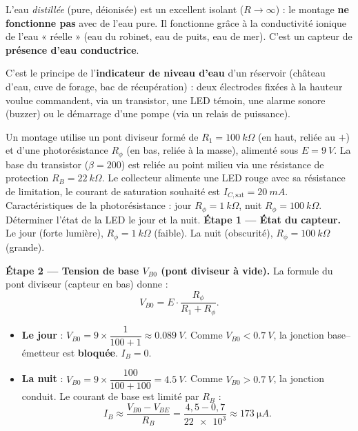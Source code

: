 \documentclass[11pt]{article}
\begin{document}
\begin{attention}
L'eau \emph{distillée} (pure, déionisée) est un excellent isolant ($R \to \infty$) : le montage \textbf{ne fonctionne pas} avec de l'eau pure. Il fonctionne grâce à la conductivité ionique de l'eau « réelle » (eau du robinet, eau de puits, eau de mer). C'est un capteur de \textbf{présence d'eau conductrice}.
\end{attention}

C'est le principe de l'\textbf{indicateur de niveau d'eau} d'un réservoir (château d'eau, cuve de forage, bac de récupération) : deux électrodes fixées à la hauteur voulue commandent, via un transistor, une LED témoin, une alarme sonore (buzzer) ou le démarrage d'une pompe (via un relais de puissance).

\begin{exoresolu}
Un montage utilise un pont diviseur formé de $R_1 = \SI{100}{k\Omega}$ (en haut, reliée au $+$) et d'une photorésistance $R_\phi$ (en bas, reliée à la masse), alimenté sous $E = \SI{9}{V}$. La base du transistor ($\beta = 200$) est reliée au point milieu via une résistance de protection $R_B = \SI{22}{k\Omega}$. Le collecteur alimente une LED rouge avec sa résistance de limitation, le courant de saturation souhaité est $I_{C,\text{sat}} = \SI{20}{mA}$. Caractéristiques de la photorésistance : jour $R_\phi = \SI{1}{k\Omega}$, nuit $R_\phi = \SI{100}{k\Omega}$. Déterminer l'état de la LED le jour et la nuit.
\tcblower
\textbf{Étape 1 — État du capteur.}
Le jour (forte lumière), $R_\phi = \SI{1}{k\Omega}$ (faible). La nuit (obscurité), $R_\phi = \SI{100}{k\Omega}$ (grande).

\textbf{Étape 2 — Tension de base $V_{B0}$ (pont diviseur à vide).}
La formule du pont diviseur (capteur en bas) donne :
\[ V_{B0} = E \cdot \frac{R_\phi}{R_1 + R_\phi}. \]
\begin{itemize}
\item \textbf{Le jour} : $V_{B0} = 9 \times \dfrac{1}{100 + 1} \approx \SI{0,089}{V}$.
Comme $V_{B0} < \SI{0,7}{V}$, la jonction base--émetteur est \textbf{bloquée}. $I_B = 0$.
\item \textbf{La nuit} : $V_{B0} = 9 \times \dfrac{100}{100 + 100} = \SI{4,5}{V}$.
Comme $V_{B0} > \SI{0,7}{V}$, la jonction conduit. Le courant de base est limité par $R_B$ :
\[ I_B \approx \frac{V_{B0} - V_{BE}}{R_B} = \frac{4{,}5 - 0{,}7}{\num{22e3}} \approx \SI{173}{\micro A}. \]
\end{itemize}


\end{exoresolu}
\end{document}
